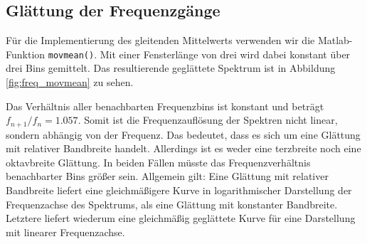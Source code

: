 \subsection{Glättung der Frequenzgänge}
\label{subsec:b}
Für die Implementierung des gleitenden Mittelwerts verwenden wir die Matlab-Funktion \texttt{movmean()}.
Mit einer Fensterlänge von drei wird dabei konstant über drei Bins gemittelt.
Das resultierende geglättete Spektrum ist in Abbildung \ref{fig:freq_movmean} zu sehen.

Das Verhältnis aller benachbarten Frequenzbins ist konstant und beträgt $f_{n+1}/f_{n} = 1.057$.
Somit ist die Frequenzauflösung der Spektren nicht linear, sondern abhängig von der Frequenz.
Das bedeutet, dass es sich um eine Glättung mit relativer Bandbreite handelt.
Allerdings ist es weder eine terzbreite noch eine oktavbreite Glättung.
In beiden Fällen müsste das Frequenzverhältnis benachbarter Bins größer sein.
Allgemein gilt: Eine Glättung mit relativer Bandbreite liefert eine gleichmäßigere Kurve in logarithmischer Darstellung der Frequenzachse des Spektrums, als eine Glättung mit konstanter Bandbreite.
Letztere liefert wiederum eine gleichmäßig geglättete Kurve für eine Darstellung mit linearer Frequenzachse.

